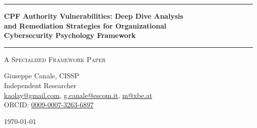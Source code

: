 \documentclass[11pt,a4paper]{article}
\begin{document}
\thispagestyle{empty}
\begin{center}

\vspace*{0.5cm}

\rule{\textwidth}{1.5pt}

\vspace{0.5cm}

{\LARGE \textbf{CPF Authority Vulnerabilities: Deep Dive Analysis}}\\[0.3cm]
{\LARGE \textbf{and Remediation Strategies for Organizational}}\\[0.3cm]
{\LARGE \textbf{Cybersecurity Psychology Framework}}

\vspace{0.5cm}

\rule{\textwidth}{1.5pt}

\vspace{0.3cm}

{\large \textsc{A Specialized Framework Paper}}

\vspace{0.5cm}

{\Large Giuseppe Canale, CISSP}\\[0.2cm]
Independent Researcher\\[0.1cm]
\href{mailto:kaolay@gmail.com}{kaolay@gmail.com}, 
\href{mailto:g.canale@escom.it}{g.canale@escom.it}, 
\href{mailto:m8xbe.at}{m@xbe.at}\\[0.1cm]
ORCID: \href{https://orcid.org/0009-0007-3263-6897}{0009-0007-3263-6897}

\vspace{0.8cm}

{\large \today}

\vspace{1cm}

\end{center}
\end{document}
